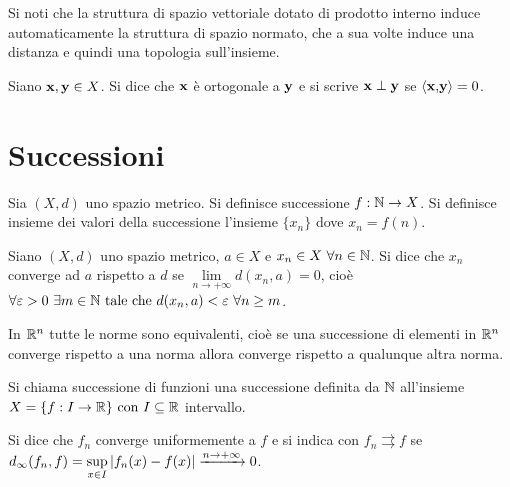 \begin{remark}
    Si noti che la struttura di spazio vettoriale dotato di prodotto interno induce automaticamente la struttura di spazio normato, che a sua volte induce una distanza e quindi una topologia sull'insieme.
\end{remark}

\begin{definition}
    [Ortogonale]
    Siano $\vb{x}, \vb{y} \in X$. Si dice che $\vb{x}$ è ortogonale a $\vb{y}$ e si scrive $\vb{x} \perp \vb{y}$ se $\left\langle\vb{x}{,}\vb{y}\right\rangle=0$.
\end{definition}

\section{Successioni}

\begin{definition}
    Sia $(X, d)$ uno spazio metrico. Si definisce successione $f: \mathbb{N} \to X$. Si definisce insieme dei valori della successione l'insieme $\{x_n\}$ dove $x_n = f(n)$.
\end{definition}

\begin{definition}
    Siano $(X, d)$ uno spazio metrico, $a \in X$ e $x_n \in X \ \forall n \in \mathbb{N}$. Si dice che $x_n$ converge ad $a$ rispetto a $d$ se $\lim\limits_{n \to + \infty}d(x_n, a) = 0$, cioè $\forall \varepsilon > 0 \ \exists m \in \mathbb{N} \text{ tale che } d(x_n, a) < \varepsilon \ \forall n \geq m$.
\end{definition}

\begin{remark}
    In $\mathbb{R}^n$ tutte le norme sono equivalenti, cioè se una successione di elementi in $\mathbb{R}^n$ converge rispetto a una norma allora converge rispetto a qualunque altra norma.
\end{remark}

\begin{definition}
    Si chiama successione di funzioni una successione definita da $\mathbb{N}$ all'insieme $X=\{f: I \to \mathbb{R}\} \text{ con } I \subseteq \mathbb{R}$ intervallo.
\end{definition}

\begin{definition}
    \label{def:unif_conv}
    Si dice che $f_n$ converge uniformemente a $f$ e si indica con $f_n \rightrightarrows f$ se $d_\infty(f_n, f) = \sup\limits_{x \in I}\abs{f_n(x) - f(x)} \xrightarrow{n \to + \infty} 0$.
\end{definition}

